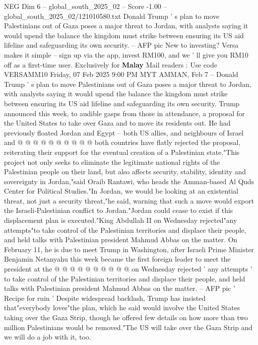 \begin{textsample}{NEG Dim 6 – global\_south\_2025\_02 – Score -1.00 – global\_south\_2025\_02/121010580.txt}  \label{ex:f6_neg_043}
Donald Trump ' s plan to move Palestinians out of Gaza poses a major threat to Jordan, with analysts saying it would upend the balance the kingdom must strike between ensuring its US aid lifeline and safeguarding its own security. -- AFP pic New to investing?
Versa makes it simple -- sign up via the app, invest RM100, and we ' ll give you RM10 off as a first-time user.
Exclusively for \textbf{Malay} Mail readers : Use code VERSAMM10 Friday, 07 Feb 2025 9:00 PM MYT AMMAN, Feb 7 -- Donald Trump ' s plan to move Palestinians out of Gaza poses a major threat to Jordan, with analysts saying it would upend the balance the kingdom must strike between ensuring its US aid lifeline and safeguarding its own security.
Trump announced this week, to audible gasps from those in attendance, a proposal for the United States to take over Gaza and to move its residents out.
He had previously floated Jordan and Egypt -- both US allies, and neighbours of Israel and @ @ @ @ @ @ @ @ @ @ both countries have flatly rejected the proposal, reiterating their support for the eventual creation of a Palestinian state."This project not only seeks to eliminate the legitimate national rights of the Palestinian people on their land, but also affects security, stability, identity and sovereignty in Jordan,"said Oraib Rantawi, who heads the Amman-based Al Quds Center for Political Studies."In Jordan, we would be looking at an existential threat, not just a security threat,"he said, warning that such a move would export the Israeli-Palestinian conflict to Jordan."Jordan could cease to exist if this displacement plan is executed."King Abdullah II on Wednesday rejected"any attempts"to take control of the Palestinian territories and displace their people, and held talks with Palestinian president Mahmud Abbas on the matter.
On February 11, he is due to meet Trump in Washington, after Israeli Prime Minister Benjamin Netanyahu this week became the first foreign leader to meet the president at the @ @ @ @ @ @ @ @ @ @ on Wednesday rejected ' any attempts ' to take control of the Palestinian territories and displace their people, and held talks with Palestinian president Mahmud Abbas on the matter. -- AFP pic ' Recipe for ruin ' Despite widespread backlash, Trump has insisted that"everybody loves"the plan, which he said would involve the United States taking over the Gaza Strip, though he offered few details on how more than two million Palestinians would be removed."The US will take over the Gaza Strip and we will do a job with it, too.

\end{textsample}
